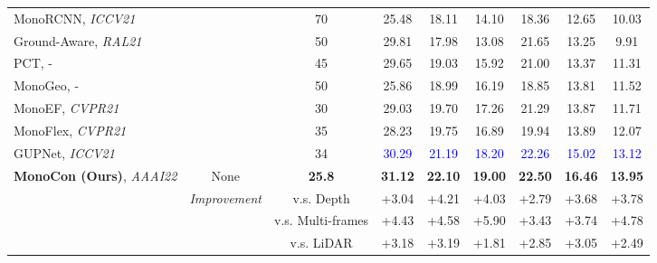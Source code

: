 \documentclass[letterpaper]{article} \usepackage{aaai22}  \usepackage{times}  \usepackage{helvet}  \usepackage{courier}  \usepackage[hyphens]{url}  \usepackage{graphicx} \urlstyle{rm} \def\UrlFont{\rm}  \usepackage{natbib}  \usepackage{caption} \DeclareCaptionStyle{ruled}{labelfont=normalfont,labelsep=colon,strut=off} \frenchspacing  \setlength{\pdfpagewidth}{8.5in}  \setlength{\pdfpageheight}{11in}  \usepackage{algorithm}
\begin{document}
\begin{table*}[t]
\begin{center}
{\begin{tabular}{l|c|c|ccc|ccc}
    MonoRCNN, \textit{ICCV21} \cite{monorcnn} &   & 70 & 25.48 & 18.11 & 14.10 & 18.36 & 12.65 & 10.03 \\
    
    Ground-Aware, \textit{RAL21} \cite{ground-aware} &   & 50 & 29.81 & 17.98 & 13.08 & 21.65 & 13.25 & 9.91 \\
    
    PCT, - \cite{pct} &   & 45 & 29.65 & 19.03 & 15.92 & 21.00 & 13.37 & 11.31 \\

    MonoGeo, - \cite{monogeo} & & 50 & 25.86 & 18.99 & 16.19 & 18.85 & 13.81 & 11.52 \\
    
    MonoEF, \textit{CVPR21} \cite{monoef} &   & 30 & 29.03 & 19.70 & 17.26 & 21.29 & 13.87 & 11.71\\

    MonoFlex, \textit{CVPR21} \cite{monoflex} &   & 35 & 28.23 & 19.75 & 16.89 & 19.94 & 13.89 & 12.07\\
    
    GUPNet, \textit{ICCV21} \cite{gupnet} & & 34 & \textcolor{blue}{30.29} & \textcolor{blue}{21.19} & \textcolor{blue}{18.20} & \textcolor{blue}{22.26} & \textcolor{blue}{15.02} & \textcolor{blue}{13.12} \\

    \midrule

    \multirow{5}{*}{\textbf{MonoCon (Ours)}, \textit{AAAI22}} & None & \textbf{25.8} & \textbf{31.12} & \textbf{22.10} & \textbf{19.00}
    & \textbf{22.50} & \textbf{16.46} & \textbf{13.95}\\
    
    \cmidrule{2-9}

     & \multirow{4}{*}{\textit{Improvement}} & v.s. Depth & +3.04 & +4.21 & +4.03
    & +2.79 & +3.68 & +3.78\\

     & & v.s. Multi-frames & +4.43 & +4.58 & +5.90
    & +3.43 & +3.74 & +4.78 \\

     & & v.s. LiDAR  & +3.18 & +3.19 & +1.81
    & +2.85 & +3.05 & +2.49\\


\end{tabular}}
\end{center}
\end{table*}
\end{document}
